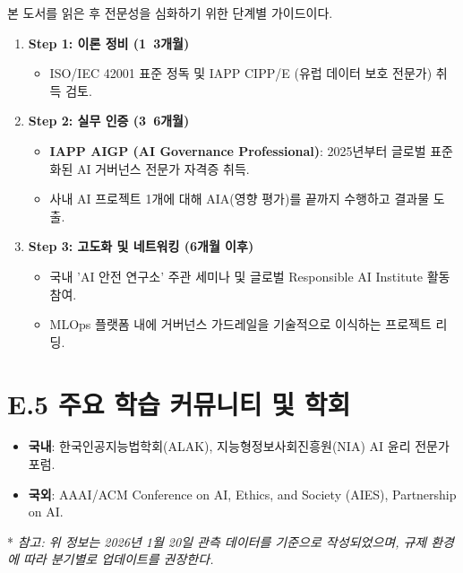 본 도서를 읽은 후 전문성을 심화하기 위한 단계별 가이드이다.

\begin{enumerate}
    \item \textbf{Step 1: 이론 정비 (1~3개월)}
    \begin{itemize}
        \item ISO/IEC 42001 표준 정독 및 IAPP CIPP/E (유럽 데이터 보호 전문가) 취득 검토.
    \end{itemize}
    \item \textbf{Step 2: 실무 인증 (3~6개월)}
    \begin{itemize}
        \item \textbf{IAPP AIGP (AI Governance Professional)}: 2025년부터 글로벌 표준화된 AI 거버넌스 전문가 자격증 취득.
        \item 사내 AI 프로젝트 1개에 대해 AIA(영향 평가)를 끝까지 수행하고 결과물 도출.
    \end{itemize}
    \item \textbf{Step 3: 고도화 및 네트워킹 (6개월 이후)}
    \begin{itemize}
        \item 국내 'AI 안전 연구소' 주관 세미나 및 글로벌 Responsible AI Institute 활동 참여.
        \item MLOps 플랫폼 내에 거버넌스 가드레일을 기술적으로 이식하는 프로젝트 리딩.
    \end{itemize}
\end{enumerate}

\section*{E.5 주요 학습 커뮤니티 및 학회}

\begin{itemize}
    \item \textbf{국내}: 한국인공지능법학회(ALAK), 지능형정보사회진흥원(NIA) AI 윤리 전문가 포럼.
    \item \textbf{국외}: AAAI/ACM Conference on AI, Ethics, and Society (AIES), Partnership on AI.
\end{itemize}
* \textit{참고: 위 정보는 2026년 1월 20일 관측 데이터를 기준으로 작성되었으며, 규제 환경에 따라 분기별로 업데이트를 권장한다.}
